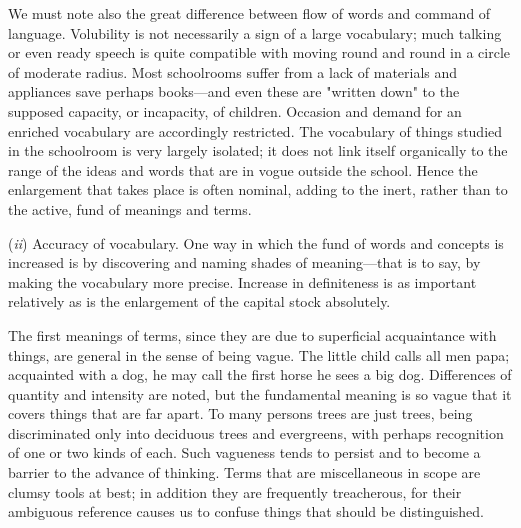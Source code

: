 \documentclass[showtrims,ustradepaper]{memoir}
\begin{document}
We must note also the great difference between flow of words and command
of language. Volubility is not necessarily a sign of a large vocabulary;
much talking or even ready speech is quite compatible with moving round
and round in a circle of moderate radius. Most schoolrooms suffer from a
lack of materials and appliances save perhaps books---and even these are
"written down" to the supposed capacity, or incapacity, of children.
Occasion and demand for an enriched vocabulary are accordingly
restricted. The vocabulary of things studied in the schoolroom is very
largely isolated; it does not link itself organically to the range of
the ideas and words that are in vogue outside the school. Hence the
enlargement that takes place is often
nominal,
adding to the inert, rather than to the active, fund of meanings and
terms.

(\emph{ii}) Accuracy of vocabulary. One way in which the fund of words
and concepts is increased is by discovering and naming shades of
meaning---that is to say, by making the vocabulary more precise.
Increase in definiteness is as important relatively as is the
enlargement of the capital stock absolutely.


The first meanings of terms, since they are due to superficial
acquaintance with things, are general in the sense of being vague. The
little child calls all men papa; acquainted with a dog, he may call the
first horse he sees a big dog. Differences of quantity and intensity are
noted, but the fundamental meaning is so vague that it covers things
that are far apart. To many persons trees are just trees, being
discriminated only into deciduous trees and evergreens, with perhaps
recognition of one or two kinds of each. Such vagueness tends to persist
and to become a barrier to the advance of thinking. Terms that are
miscellaneous in scope are clumsy tools at best; in addition they are
frequently treacherous, for their ambiguous reference causes us to
confuse things that should be distinguished.

\end{document}

